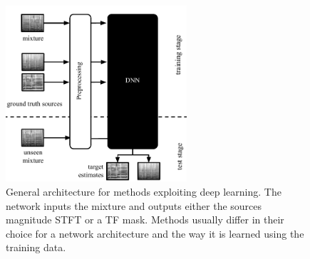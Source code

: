 \begin{figure}
  \centering
  \includegraphics[width=0.6\textwidth]{Chapters/06_Separation_Unknown/figures/methods_dnn.pdf}
  \caption{General architecture for methods exploiting deep learning. The network inputs the mixture and outputs either the sources magnitude STFT or a TF mask. Methods usually differ in their choice for a network architecture and the way it is learned using the training data.}
  \label{fig:methods_dnn}
\end{figure}

